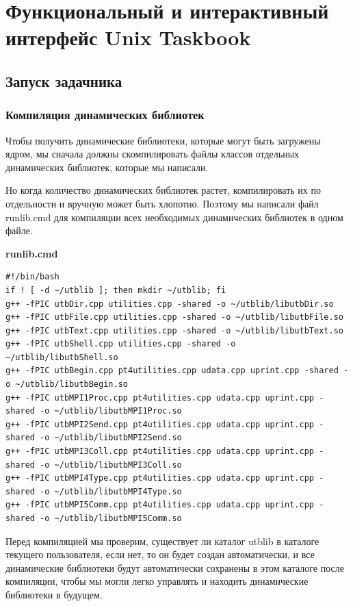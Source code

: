 \section{Функциональный и интерактивный интерфейс Unix Taskbook}

\subsection{Запуск задачника}

\subsubsection{Компиляция динамических библиотек}

Чтобы получить динамические библиотеки, которые могут быть загружены ядром, мы 
сначала должны скомпилировать файлы классов отдельных динамических библиотек, которые мы написали.

Но когда количество динамических библиотек растет, компилировать их по отдельности и 
вручную может быть хлопотно. Поэтому мы написали файл runlib.cmd для компиляции всех 
необходимых динамических библиотек в одном файле.

\centerline{\textbf{runlib.cmd}}

\lstset{language=bash}
\begin{lstlisting}
#!/bin/bash
if ! [ -d ~/utblib ]; then mkdir ~/utblib; fi
g++ -fPIC utbDir.cpp utilities.cpp -shared -o ~/utblib/libutbDir.so
g++ -fPIC utbFile.cpp utilities.cpp -shared -o ~/utblib/libutbFile.so
g++ -fPIC utbText.cpp utilities.cpp -shared -o ~/utblib/libutbText.so
g++ -fPIC utbShell.cpp utilities.cpp -shared -o ~/utblib/libutbShell.so
g++ -fPIC utbBegin.cpp pt4utilities.cpp udata.cpp uprint.cpp -shared -o ~/utblib/libutbBegin.so
g++ -fPIC utbMPI1Proc.cpp pt4utilities.cpp udata.cpp uprint.cpp -shared -o ~/utblib/libutbMPI1Proc.so
g++ -fPIC utbMPI2Send.cpp pt4utilities.cpp udata.cpp uprint.cpp -shared -o ~/utblib/libutbMPI2Send.so
g++ -fPIC utbMPI3Coll.cpp pt4utilities.cpp udata.cpp uprint.cpp -shared -o ~/utblib/libutbMPI3Coll.so
g++ -fPIC utbMPI4Type.cpp pt4utilities.cpp udata.cpp uprint.cpp -shared -o ~/utblib/libutbMPI4Type.so
g++ -fPIC utbMPI5Comm.cpp pt4utilities.cpp udata.cpp uprint.cpp -shared -o ~/utblib/libutbMPI5Comm.so
\end{lstlisting}

Перед компиляцией мы проверим, существует ли каталог utblib в каталоге текущего
 пользователя, если нет, то он будет создан автоматически, и все динамические
  библиотеки будут автоматически сохранены в этом каталоге после компиляции, чтобы 
  мы могли легко управлять и находить динамические библиотеки в будущем.

